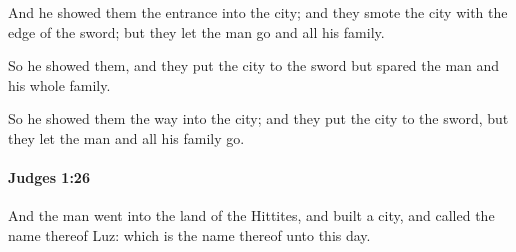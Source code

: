 			\begin{versebox}
					\item[BHS] 
					\item[ASV] And he showed them the entrance into the city; and they smote the city with the edge of the sword; but they let the man go and all his family.
					\item[NIV] So he showed them, and they put the city to the sword but spared the man and his whole family.
					\item[NRSV] So he showed them the way into the city; and they put the city to the sword, but they let the man and all his family go.
			\end{versebox}

		\paragraph{Judges 1:26} %
			\label{JUDGES-1-26}

			And the man went into the land of the Hittites, and built a city, and called the name thereof Luz: which is the name thereof unto this day.

